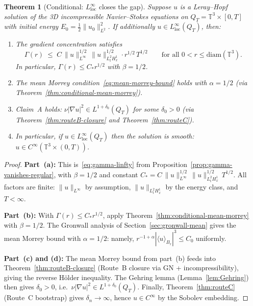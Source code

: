 \documentclass[11pt]{article}
\newtheorem{theorem}{Theorem}[section]
\theoremstyle{definition}
\theoremstyle{remark}
\newcommand{\T}{\mathbb{T}}
\newcommand{\grad}{\nabla}
\begin{document}
\begin{theorem}[Conditional: $L^\infty_{\mathrm{loc}}$ closes the gap]
\label{thm:linfty-closes-gap}
Suppose $u$ is a Leray--Hopf solution of the 3D incompressible
Navier--Stokes equations on $Q_T = \T^3 \times [0,T]$ with initial
energy $E_0 = \tfrac{1}{2}\|u_0\|_{L^2}^2$.
If additionally $u \in L^\infty_{\mathrm{loc}}(Q_T)$, then:
\begin{enumerate}[label=(\alph*)]
\item The gradient concentration satisfies
  \begin{equation}\label{eq:gamma-linfty-close}
    \Gamma(r) \;\leq\; C\,\|u\|_{L^\infty}^{1/2}\,\|u\|_{L^2_t H^1_x}^{1/2}
    \cdot r^{1/2}\,T^{1/2}
    \qquad \text{for all } 0 < r \leq \mathrm{diam}(\T^3).
  \end{equation}
  In particular, $\Gamma(r) \leq C_* r^{1/2}$ with $\beta = 1/2$.

\item The mean Morrey condition~\eqref{eq:mean-morrey-bound} holds
  with $\alpha = 1/2$ (via Theorem~\ref{thm:conditional-mean-morrey}).

\item Claim~A holds: $\nu|\grad u|^2 \in L^{1+\delta_0}(Q_T)$ for some
  $\delta_0 > 0$ (via Theorem~\ref{thm:routeB-closure} and
  Theorem~\ref{thm:routeC}).

\item In particular, if $u \in L^\infty_{\mathrm{loc}}(Q_T)$ then the
  solution is smooth: $u \in C^\infty(\T^3 \times (0,T))$.
\end{enumerate}
\end{theorem}

\begin{proof}
\textbf{Part~(a):}
This is~\eqref{eq:gamma-linfty} from Proposition~\ref{prop:gamma-vanishes-regular},
with $\beta = 1/2$ and constant
$C_* = C\,\|u\|_{L^\infty}^{1/2}\,\|u\|_{L^2_t H^1_x}^{1/2}\,T^{1/2}$.
All factors are finite: $\|u\|_{L^\infty}$ by assumption, $\|u\|_{L^2_t H^1_x}$
by the energy class, and $T < \infty$.

\textbf{Part~(b):}
With $\Gamma(r) \leq C_* r^{1/2}$, apply
Theorem~\ref{thm:conditional-mean-morrey} with $\beta = 1/2$.
The Gronwall analysis of Section~\ref{sec:gronwall-mean} gives the mean
Morrey bound with $\alpha = 1/2$: namely,
$r^{-1+\alpha}|\langle u \rangle_{B_r}|^3 \leq C_0$ uniformly.

\textbf{Part~(c) and (d):}
The mean Morrey bound from part~(b) feeds into
Theorem~\ref{thm:routeB-closure} (Route~B closure via GN + incompressibility),
giving the reverse H\"older inequality.
The Gehring lemma (Lemma~\ref{lem:Gehring}) then gives $\delta_0 > 0$,
i.e.\ $\nu|\grad u|^2 \in L^{1+\delta_0}(Q_T)$.
Finally, Theorem~\ref{thm:routeC} (Route~C bootstrap) gives
$\delta_n \to \infty$, hence $u \in C^\infty$ by the Sobolev embedding.
\end{proof}
\end{document}
